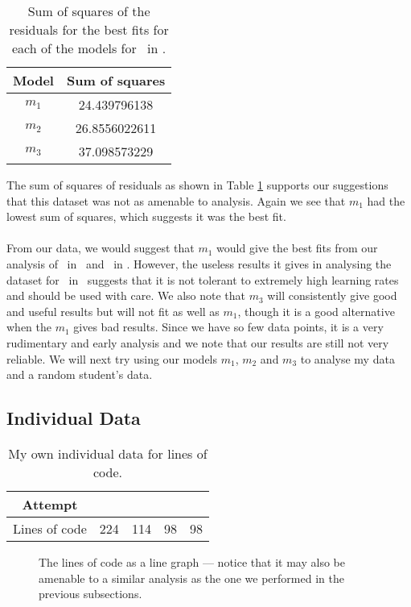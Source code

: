 \begin{table}[ht!]
\centering
\begin{tabular}{|c|c|}
\hline
{\bf Model} & Sum of squares \\
\hline
$m_1$ & 24.439796138\\
\hline
$m_2$ & 26.8556022611\\
\hline
$m_3$ & 37.098573229\\
\hline
\end{tabular}
\caption{Sum of squares of the residuals for the best fits for each of the models for \PT\ in \LA.}
\label{table:P2LA:abc:error}
\end{table}

The sum of squares of residuals as shown in Table \ref{table:P2LA:abc:error}
supports our suggestions that this dataset was not as amenable to analysis.
Again we see that $m_1$ had the lowest sum of squares, which suggests it was the
best fit.\\
\\
From our data, we would suggest that $m_1$ would give the best fits from our analysis of \PT\
in \LA\ and \PO\ in \LB.
However, the useless results it gives in analysing the dataset for \PO\ in \LA\
suggests that it is not tolerant to extremely high learning rates and should be
used with care.
We also note that $m_3$ will consistently give good and useful results but will
not fit as well as $m_1$, though it is a good alternative when the $m_1$ gives
bad results.
Since we have so few data points, it is a very rudimentary and early analysis
and we note that our results are still not very reliable.
We will next try using our models $m_1$, $m_2$ and $m_3$ to analyse my data and
a random student's data.

\subsection{Individual Data}

\begin{table}
\centering
\begin{tabular}{|c|c|c|c|c|}
\hline
Attempt & \AZ & \AO & \AT & \ATh\\
\hline
Lines of code & 224 & 114 & 98 & 98 \\
\hline
\end{tabular}
\caption{My own individual data for lines of code.}
\label{table:loc}
\end{table}

\begin{figure}
\centering
\FIXME
\caption{The lines of code as a line graph --- notice that it may also be
  amenable to a similar analysis as the one we performed in the previous
    subsections.}
\label{figure:loc}
\end{figure}


